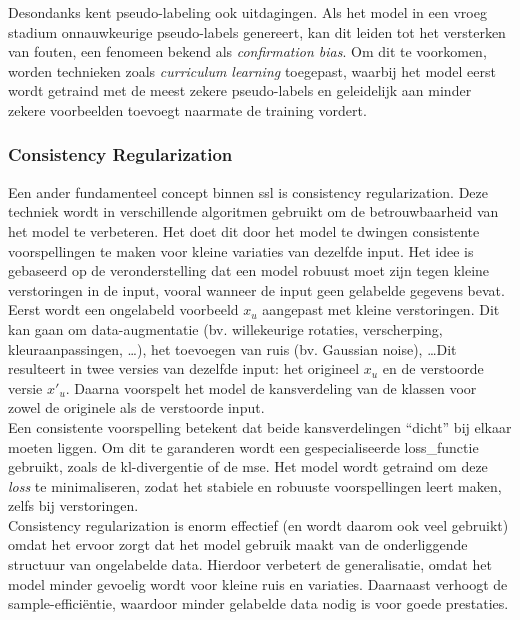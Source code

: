 Desondanks kent pseudo-labeling ook uitdagingen. Als het model in een vroeg stadium onnauwkeurige pseudo-labels genereert, kan dit leiden tot het versterken van fouten, een fenomeen bekend als \emph{confirmation bias}. Om dit te voorkomen, worden technieken zoals \emph{curriculum learning} toegepast, waarbij het model eerst wordt getraind met de meest zekere pseudo-labels en geleidelijk aan minder zekere voorbeelden toevoegt naarmate de training vordert. \autocite{Cascante_Bonilla_2020}

\subsubsection{Consistency Regularization}

Een ander fundamenteel concept binnen \gls{ssl} is consistency regularization. Deze techniek wordt in verschillende algoritmen gebruikt om de betrouwbaarheid van het model te verbeteren. Het doet dit door het model te dwingen consistente voorspellingen te maken voor kleine variaties van dezelfde input. Het idee is gebaseerd op de veronderstelling dat een model robuust moet zijn tegen kleine verstoringen in de input, vooral wanneer de input geen gelabelde gegevens bevat. \\

Eerst wordt een ongelabeld voorbeeld $x_u$ aangepast met kleine verstoringen. Dit kan gaan om data-augmentatie (bv. willekeurige rotaties, verscherping, kleuraanpassingen, \dots), het toevoegen van ruis (bv. Gaussian noise), \dots Dit resulteert in twee versies van dezelfde input: het origineel $x_u$ en de verstoorde versie $x'_u$. Daarna voorspelt het model de kansverdeling van de klassen voor zowel de originele als de verstoorde input. \\

Een consistente voorspelling betekent dat beide kansverdelingen ``dicht'' bij elkaar moeten liggen. Om dit te garanderen wordt een gespecialiseerde \gls{loss_functie} gebruikt, zoals de \gls{kl}-divergentie \autocite{Hall_1987} of de \gls{mse}. Het model wordt getraind om deze \emph{loss} te minimaliseren, zodat het stabiele en robuuste voorspellingen leert maken, zelfs bij verstoringen. \\

Consistency regularization is enorm effectief (en wordt daarom ook veel gebruikt) omdat het ervoor zorgt dat het model gebruik maakt van de onderliggende structuur van ongelabelde data. Hierdoor verbetert de generalisatie, omdat het model minder gevoelig wordt voor kleine ruis en variaties. Daarnaast verhoogt de sample-efficiëntie, waardoor minder gelabelde data nodig is voor goede prestaties. \autocite{Fan_2022}

